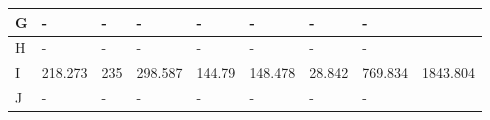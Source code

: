 \begin{landscape}
\begin{longtable}[c]{|l|llllllll|}
    G                                                                               & \multicolumn{1}{l|}{-}                                                              & \multicolumn{1}{l|}{-}                                                              & \multicolumn{1}{l|}{-}                                                              & \multicolumn{1}{l|}{-}                                                              & \multicolumn{1}{l|}{-}                                         & \multicolumn{1}{l|}{-}                                         & \multicolumn{1}{l|}{-}                                             &                                                                                        \\ \hline
    H                                                                               & \multicolumn{1}{l|}{-}                                                              & \multicolumn{1}{l|}{-}                                                              & \multicolumn{1}{l|}{-}                                                              & \multicolumn{1}{l|}{-}                                                              & \multicolumn{1}{l|}{-}                                         & \multicolumn{1}{l|}{-}                                         & \multicolumn{1}{l|}{-}                                             &                                                                                        \\ \hline
    I                                                                               & \multicolumn{1}{l|}{218.273}                                                        & \multicolumn{1}{l|}{235}                                                            & \multicolumn{1}{l|}{298.587}                                                        & \multicolumn{1}{l|}{144.79}                                                         & \multicolumn{1}{l|}{148.478}                                   & \multicolumn{1}{l|}{28.842}                                    & \multicolumn{1}{l|}{769.834}                                       & 1843.804                                                                               \\ \hline
    J                                                                               & \multicolumn{1}{l|}{-}                                                              & \multicolumn{1}{l|}{-}                                                              & \multicolumn{1}{l|}{-}                                                              & \multicolumn{1}{l|}{-}                                                              & \multicolumn{1}{l|}{-}                                         & \multicolumn{1}{l|}{-}                                         & \multicolumn{1}{l|}{-}                                             &                                                                                        \\ \hline

\end{longtable}
\end{landscape}
